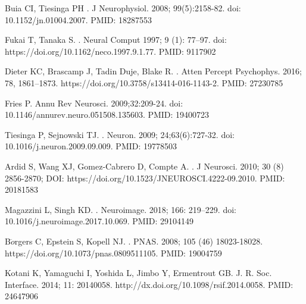 \documentclass[10pt,letterpaper]{article}
\begin{document}
\begin{thebibliography}{10}
Buia CI, Tiesinga PH
.
\newblock J Neurophysiol. 2008; 99(5):2158-82. doi: 10.1152/jn.01004.2007. PMID: 18287553

Fukai T, Tanaka S.
.
\newblock Neural Comput 1997; 9 (1): 77–97. doi: https://doi.org/10.1162/neco.1997.9.1.77. PMID: 9117902

Dieter KC, Brascamp J, Tadin Duje, Blake R.
.
\newblock Atten Percept Psychophys. 2016; 78, 1861–1873. https://doi.org/10.3758/s13414-016-1143-2. PMID: 27230785


Fries P.
\newblock Annu Rev Neurosci. 2009;32:209-24. doi: 10.1146/annurev.neuro.051508.135603. PMID: 19400723


Tiesinga P, Sejnowski TJ.
.
\newblock Neuron. 2009; 24;63(6):727-32. doi: 10.1016/j.neuron.2009.09.009. PMID: 19778503


Ardid S, Wang XJ, Gomez-Cabrero D, Compte A.
.
\newblock J Neurosci. 2010; 30 (8) 2856-2870; DOI: https://doi.org/10.1523/JNEUROSCI.4222-09.2010. PMID: 20181583


Magazzini L, Singh KD.
.
\newblock Neuroimage. 2018; 166: 219–229. doi: 10.1016/j.neuroimage.2017.10.069. PMID: 29104149

B$\ddot{o}$rgers C, Epstein S, Kopell NJ.
.
\newblock PNAS. 2008; 105 (46) 18023-18028. https://doi.org/10.1073/pnas.0809511105. PMID: 19004759

Kotani K, Yamaguchi I, Yoshida L, Jimbo Y, Ermentrout GB.
\newblock J. R. Soc. Interface. 2014; 11: 20140058. http://dx.doi.org/10.1098/rsif.2014.0058. PMID: 24647906


\end{thebibliography}
\end{document}
